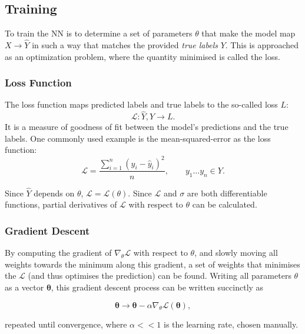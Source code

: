     \subsection{Training \label{ssec: training}}
        To train the NN is to determine a set of parameters $\theta$ that make the model map $X \rightarrow \hat{Y}$ in such a way that matches the provided \textit{true labels} $Y$. This is approached as an optimization problem, where the quantity minimised is called the loss.
        
        \subsubsection{Loss Function}
            The loss function maps predicted labels and true labels to the so-called loss $L$: \[\mathcal{L} : \hat{Y}, Y \rightarrow L.\] It is a measure of goodness of fit between the model's predictions and the true labels. One commonly used example is the mean-squared-error as the loss function:
            \[
                \mathcal{L} = \frac{\sum_{i = 1}^{n}(y_i - \hat{y}_i)^2}{n}, \hspace{2em} y_1 \dots y_n \in Y.
            \]
            
            Since $\hat{Y}$ depends on $\theta$, $\mathcal{L} = \mathcal{L}(\theta)$. Since $\mathcal{L}$ and $\sigma$ are both differentiable functions, partial derivatives of $\mathcal{L}$ with respect to $\theta$ can be calculated. 
        
        \subsubsection{Gradient Descent}
            By computing the gradient of $\nabla_\theta \mathcal{L}$ with respect to $\theta$, and slowly moving all weights towards the minimum along this gradient, a set of weights that minimises the $\mathcal{L}$ (and thus optimises the prediction) can be found. Writing all parameters $\theta$ as a vector $\boldsymbol{\theta}$, this gradient descent process can be written succinctly as
            
            \begin{equation}
                \boldsymbol{\theta} \rightarrow \boldsymbol{\theta} - \alpha \nabla_\theta \mathcal{L}(\boldsymbol{\theta}),
            \end{equation}
            
            repeated until convergence, where $\alpha << 1$ is the learning rate, chosen manually.